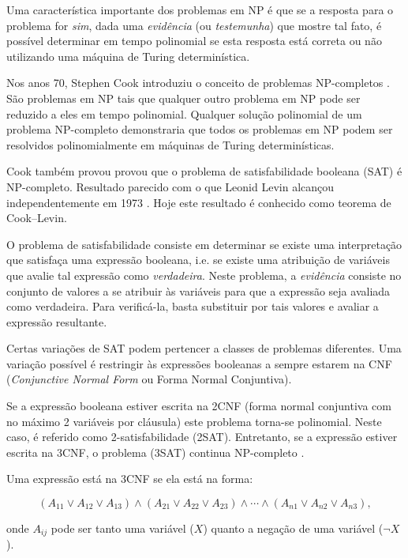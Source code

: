 \documentclass[a4paper,12pt,oneside,onecolumn]{uerj}
\begin{document}
Uma característica importante dos problemas em NP é que se a resposta para o problema for \emph{sim}, dada uma \emph{evidência} (ou \emph{testemunha}) que mostre tal fato, é possível determinar em tempo polinomial se esta resposta está correta ou não utilizando uma máquina de Turing determinística.

Nos anos 70, Stephen Cook introduziu o conceito de problemas NP-completos \cite{bib:Cook71}. São problemas em NP tais que qualquer outro problema em NP pode ser reduzido a eles em tempo polinomial. Qualquer solução polinomial de um problema NP-completo demonstraria que todos os problemas em NP podem ser resolvidos polinomialmente em máquinas de Turing determinísticas.

Cook também provou provou que o problema de satisfabilidade booleana (SAT) é NP-completo. Resultado parecido com o que Leonid Levin alcançou independentemente em 1973 \cite{bib:Levin73}. Hoje este resultado é conhecido como teorema de Cook--Levin. 

O problema de satisfabilidade consiste em determinar se existe uma interpretação que satisfaça uma expressão booleana, i.e. se existe uma atribuição de variáveis que avalie tal expressão como \emph{verdadeira}. Neste problema, a \emph{evidência} consiste no conjunto de valores a se atribuir às variáveis para que a expressão seja avaliada como verdadeira. Para verificá-la, basta substituir por tais valores e avaliar a expressão resultante.

Certas variações de SAT podem pertencer a classes de problemas diferentes. Uma variação possível é restringir às expressões booleanas a sempre estarem na CNF (\emph{Conjunctive Normal Form} ou Forma Normal Conjuntiva). 

Se a expressão booleana estiver escrita na 2CNF (forma normal conjuntiva com no máximo 2 variáveis por cláusula) este problema torna-se polinomial. Neste caso, é referido como 2-satisfabilidade (2SAT). Entretanto, se a expressão estiver escrita na 3CNF, o problema (3SAT) continua NP-completo \cite{bib:Karp72}.

Uma expressão está na 3CNF se ela está na forma:

\begin{equation*}
(A_{11} \lor A_{12} \lor A_{13}) \wedge (A_{21} \lor A_{22} \lor A_{23}) \wedge \cdots \wedge (A_{n1} \lor A_{n2} \lor A_{n3}),
\end{equation*}


onde $A_{ij}$ pode ser tanto uma variável ($X$) quanto a negação de uma variável ($\neg X$).
\end{document}
